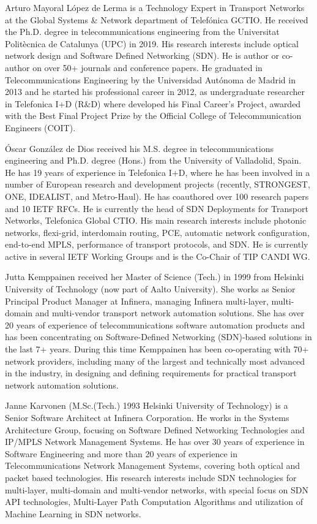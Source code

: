 \documentclass[a4paper,fleqn]{cas-dc}
\begin{document}
Arturo Mayoral López de Lerma is a Technology Expert in Transport Networks at the Global Systems \& Network department of Telefónica GCTIO. He received the Ph.D. degree in telecommunications engineering from the Universitat Politècnica de Catalunya (UPC) in 2019. His  research  interests  include  optical network design and Software Defined Networking (SDN). He is author or co-author on over 50+ journals and conference papers.
He graduated in Telecommunications Engineering by the Universidad Autónoma de Madrid in 2013 and he started his professional career in 2012, as undergraduate researcher in Telefonica I+D (R\&D) where developed his Final Career’s Project, awarded with the Best Final Project Prize by the Official College of Telecommunication Engineers (COIT).
\endbio

Óscar González de Dios received his M.S. degree in telecommunications engineering and Ph.D. degree (Hons.) from the University of Valladolid, Spain. He has 19 years of experience in Telefonica I+D, where he has been involved in a number of European research and development projects (recently, STRONGEST, ONE, IDEALIST, and Metro-Haul). He has coauthored over 100 research papers and 10 IETF RFCs. He is currently the head of SDN Deployments for Transport Networks, Telefonica Global CTIO. His main research interests include photonic networks, flexi-grid, interdomain routing, PCE, automatic network configuration, end-to-end MPLS, performance of transport protocols, and SDN. He is currently active in several IETF Working Groups and is the Co-Chair of TIP CANDI WG.
\endbio

Jutta Kemppainen received her Master of Science (Tech.) in 1999 from Helsinki University of Technology (now part of Aalto University). She works as Senior Principal Product Manager at Infinera, managing Infinera multi-layer, multi-domain and multi-vendor transport network automation solutions. She has over 20 years of experience of telecommunications software automation products and has been concentrating on Software-Defined Networking (SDN)-based solutions in the last 7+ years. During this time Kemppainen has been co-operating with 70+ network providers, including many of the largest and technically most advanced in the industry, in designing and defining requirements for practical transport network automation solutions.
\endbio

Janne Karvonen (M.Sc.(Tech.) 1993 Helsinki University of Technology) is a Senior Software Architect at Infinera Corporation. He works in the Systems Architecture Group, focusing on Software Defined Networking Technologies and IP/MPLS Network Management Systems. He has over 30 years of experience in Software Engineering and more than 20 years of experience in Telecommunications Network Management Systems, covering both optical and packet based technologies. His research interests include SDN technologies for multi-layer, multi-domain and multi-vendor networks, with special focus on SDN API technologies, Multi-Layer Path Computation Algorithms and utilization of Machine Learning in SDN networks.
\endbio
\end{document}
